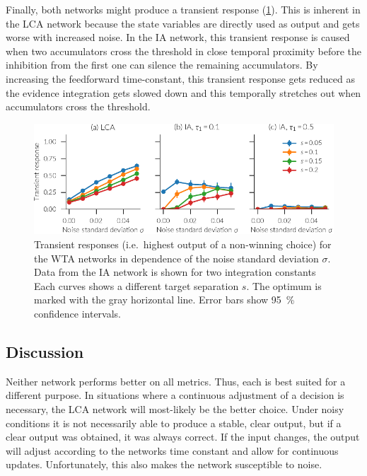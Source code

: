 Finally, both networks might produce a transient response (\cref{fig:ia-transient}).
This is inherent in the LCA network because the state variables are directly used as output and gets worse with increased noise.
In the IA network, this transient response is caused when two accumulators cross the threshold in close temporal proximity before the inhibition from the first one can silence the remaining accumulators.
By increasing the feedforward time-constant, this transient response gets reduced as the evidence integration gets slowed down and this temporally stretches out when accumulators cross the threshold.
\begin{figure}
    \centering
    \includegraphics{figures/ia-transient}
    \caption[Transient WTA responses]{Transient responses (i.e.\ highest output of a non-winning choice) for the WTA networks in dependence of the noise standard deviation $\sigma$. Data from the IA network is shown for two integration constants Each curves shows a different target separation $s$. The optimum is marked with the gray horizontal line. Error bars show \SI{95}{\percent} confidence intervals.}\label{fig:ia-transient}
\end{figure}


\subsection{Discussion}
Neither network performs better on all metrics.
Thus, each is best suited for a different purpose.
In situations where a continuous adjustment of a decision is necessary, the LCA network will most-likely be the better choice.
Under noisy conditions it is not necessarily able to produce a stable, clear output, but if a clear output was obtained, it was always correct.
If the input changes, the output will adjust according to the networks time constant and allow for continuous updates.
Unfortunately, this also makes the network susceptible to noise.

